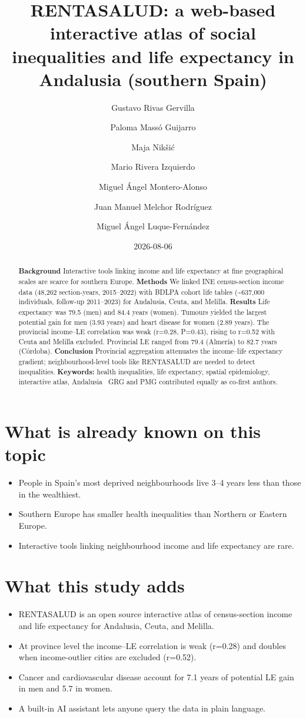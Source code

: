 \documentclass[
  11pt,
  a4paper,
]{article}
\title{RENTASALUD: a web-based interactive atlas of social inequalities
and life expectancy in Andalusia (southern Spain)}
\author{Gustavo Rivas Gervilla \and Paloma Massó Guijarro \and Maja
Nikšić \and Mario Rivera Izquierdo \and Miguel Ángel
Montero-Alonso \and Juan Manuel Melchor Rodríguez \and Miguel Ángel
Luque-Fernández}
\date{2026-08-06}
\providecommand{\tightlist}{%
  \setlength{\itemsep}{0pt}\setlength{\parskip}{0pt}}
\begin{document}
\maketitle
\begin{abstract}
\textbf{Background} Interactive tools linking income and life expectancy
at fine geographical scales are scarce for southern Europe.
\textbf{Methods} We linked INE census-section income data (48,262
section-years, 2015--2022) with BDLPA cohort life tables
(\textasciitilde637,000 individuals, follow-up 2011--2023) for
Andalusia, Ceuta, and Melilla. \textbf{Results} Life expectancy was 79.5
(men) and 84.4 years (women). Tumours yielded the largest potential gain
for men (3.93 years) and heart disease for women (2.89 years). The
provincial income--LE correlation was weak (r=0.28, P=0.43), rising to
r=0.52 with Ceuta and Melilla excluded. Provincial LE ranged from 79.4
(Almería) to 82.7 years (Córdoba). \textbf{Conclusion} Provincial
aggregation attenuates the income--life expectancy gradient;
neighbourhood-level tools like RENTASALUD are needed to detect
inequalities. \textbf{Keywords:} health inequalities, life expectancy,
spatial epidemiology, interactive atlas, Andalusia ~GRG and PMG
contributed equally as co-first authors.
\end{abstract}


\section{What is already known on this
topic}\label{what-is-already-known-on-this-topic}

\begin{itemize}
\tightlist
\item
  People in Spain's most deprived neighbourhoods live 3--4 years less
  than those in the wealthiest.
\item
  Southern Europe has smaller health inequalities than Northern or
  Eastern Europe.
\item
  Interactive tools linking neighbourhood income and life expectancy are
  rare.
\end{itemize}

\section{What this study adds}\label{what-this-study-adds}

\begin{itemize}
\tightlist
\item
  RENTASALUD is an open source interactive atlas of census-section
  income and life expectancy for Andalusia, Ceuta, and Melilla.
\item
  At province level the income--LE correlation is weak (r=0.28) and
  doubles when income-outlier cities are excluded (r=0.52).
\item
  Cancer and cardiovascular disease account for 7.1 years of potential
  LE gain in men and 5.7 in women.
\item
  A built-in AI assistant lets anyone query the data in plain language.
\end{itemize}
\end{document}

